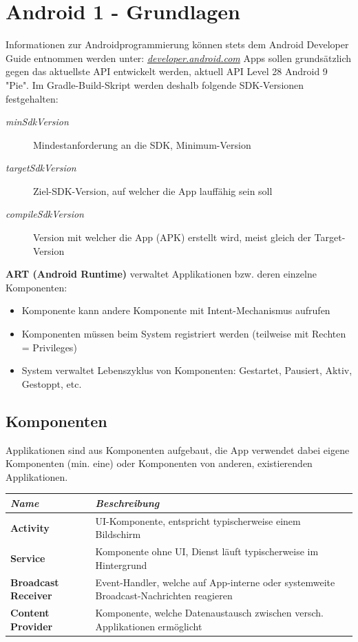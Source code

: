 \documentclass[a4paper]{article}
\begin{document}
	\section{Android 1 - Grundlagen}
	Informationen zur Androidprogrammierung können stets dem Android Developer Guide entnommen werden unter: \textit{\href{https://developer.android.com/}{developer.android.com}}
	Apps sollen grundsätzlich gegen das aktuellste API entwickelt werden, aktuell API Level 28 Android 9 "Pie".
	Im Gradle-Build-Skript werden deshalb folgende SDK-Versionen festgehalten:
\vspace{1em}
	\begin{description}
		\item[\textit{minSdkVersion}] Mindestanforderung an die SDK, Minimum-Version
		\item[\textit{targetSdkVersion}] Ziel-SDK-Version, auf welcher die App lauffähig sein soll
		\item[\textit{compileSdkVersion}] Version mit welcher die App (APK) erstellt wird, meist gleich der Target-Version	
	\end{description}
\vspace{1em}
	\textbf{ART (Android Runtime)} verwaltet Applikationen bzw. deren einzelne Komponenten:
	\begin{itemize}
		\item Komponente kann andere Komponente mit Intent-Mechanismus aufrufen
		\item Komponenten müssen beim System registriert werden (teilweise mit Rechten = Privileges)
		\item System verwaltet Lebenszyklus von Komponenten: Gestartet, Pausiert, Aktiv, Gestoppt, etc.
	\end{itemize}
\subsection{Komponenten}
	Applikationen sind aus Komponenten aufgebaut, die App verwendet dabei eigene Komponenten (min. eine) oder Komponenten von anderen, existierenden Applikationen.
\begin{table}[h!]
	\begin{tabular}{ l | p{11cm} }
		\textbf{\textit{Name}}               & \textbf{\textit{Beschreibung}} \\
		\hline
		\textbf{Activity}           & UI-Komponente, entspricht typischerweise einem Bildschirm \\
		\textbf{Service}            & Komponente ohne UI, Dienst läuft typischerweise im Hintergrund \\
		\textbf{Broadcast Receiver} & Event-Handler, welche auf App-interne oder systemweite Broadcast-Nachrichten reagieren \\
		\textbf{Content Provider}   & Komponente, welche Datenaustausch zwischen versch. Applikationen ermöglicht
	\end{tabular}
\end{table}
\end{document}
